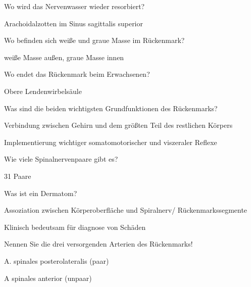 \documentclass[10pt, a4paper]{exam}
\begin{document}
\begin{questions}
  \question Wo wird das Nervenwasser wieder resorbiert?
  \begin{solution}
    Arachoidalzotten im Sinus sagittalis superior
  \end{solution}

  \question Wo befinden sich weiße und graue Masse im Rückenmark?
  \begin{solution}
    weiße Masse außen, graue Masse innen
  \end{solution}

  \question Wo endet das Rückenmark beim Erwachsenen?
  \begin{solution}
    Obere Lendenwirbelsäule
  \end{solution}

  \question Was sind die beiden wichtigsten Grundfunktionen des Rückenmarks?
  \begin{solution}
    \begin{itemize*}
      \item Verbindung zwischen Gehirn und dem größten Teil des restlichen Körpers
      \item Implementierung wichtiger somatomotorischer und viszeraler Reflexe
    \end{itemize*}
  \end{solution}

  \question Wie viele Spinalnervenpaare gibt es?
  \begin{solution}
31 Paare
  \end{solution}

  \question Was ist ein Dermatom?
  \begin{solution}
\begin{itemize*}
  \item Assoziation zwischen Körperoberfläche und Spiralnerv/ Rückenmarkssegmente
  \item Klinisch bedeutsam für diagnose von Schäden
\end{itemize*}
  \end{solution}

  \question Nennen Sie die drei versorgenden Arterien des Rückenmarks!
  \begin{solution}
    \begin{itemize*}
      \item A. spinales posterolateralis (paar)
    \item A spinales anterior (unpaar)
    \end{itemize*}
  \end{solution}


\end{questions}
\end{document}

